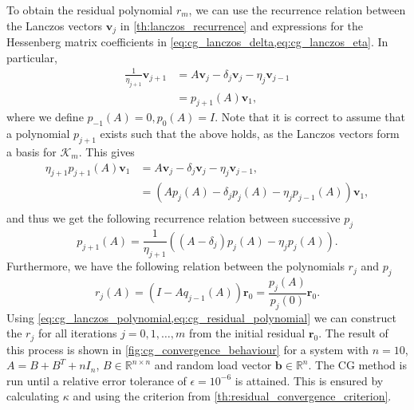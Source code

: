 To obtain the residual polynomial $r_m$, we can use the recurrence relation between the Lanczos vectors $\mathbf{v}_j$ in \cref{th:lanczos_recurrence} and expressions for the Hessenberg matrix coefficients in \cref{eq:cg_lanczos_delta,eq:cg_lanczos_eta}. In particular,
\begin{align*}
  \frac{1}{\eta_{j+1}} \mathbf{v}_{j+1} & = A \mathbf{v}_j - \delta_j \mathbf{v}_j - \eta_j \mathbf{v}_{j-1} \\
                                        & = p_{j+1}(A) \mathbf{v}_1,
\end{align*}
where we define $p_{-1}(A) = 0, p_0(A) = I$. Note that it is correct to assume that a polynomial $p_{j+1}$ exists such that the above holds, as the Lanczos vectors form a basis for $\mathcal{K}_m$. This gives
\begin{align*}
  \eta_{j+1}p_{j+1}(A)\mathbf{v}_1 & = A \mathbf{v}_j - \delta_j \mathbf{v}_j - \eta_j \mathbf{v}_{j-1},          \\
                                   & = \left( A p_j(A) - \delta_j p_j(A) - \eta_j p_{j-1}(A) \right)\mathbf{v}_1, \\
\end{align*}
and thus we get the following recurrence relation between successive $p_j$
\begin{equation}
  p_{j+1}(A) = \frac{1}{\eta_{j+1}}\left( (A - \delta_j )p_j(A) - \eta_j p_{j}(A) \right).
  \label{eq:cg_lanczos_polynomial}
\end{equation}
Furthermore, we have the following relation between the polynomials $r_j$ and $p_j$ \cite[Section 3.2]{Meurant_Strakoš_2006}
\begin{equation}
  r_{j}(A) = (I-Aq_{j-1}(A))\mathbf{r}_0 = \frac{p_{j}(A)}{p_{j}(0)}\mathbf{r}_0.
  \label{eq:cg_residual_polynomial}
\end{equation}
Using \cref{eq:cg_lanczos_polynomial,eq:cg_residual_polynomial} we can construct the $r_j$ for all iterations $j=0,1,\dots,m$ from the initial residual $\mathbf{r}_0$. The result of this process is shown in \cref{fig:cg_convergence_behaviour} for a system with $n=10$, $A = B + B^T + nI_n$, $B\in\mathbb{R}^{n \times n}$ and random load vector $\mathbf{b}\in\mathbb{R}^n$. The CG method is run until a relative error tolerance of $\epsilon = 10^{-6}$ is attained. This is ensured by calculating $\kappa$ and using the criterion from \cref{th:residual_convergence_criterion}.


